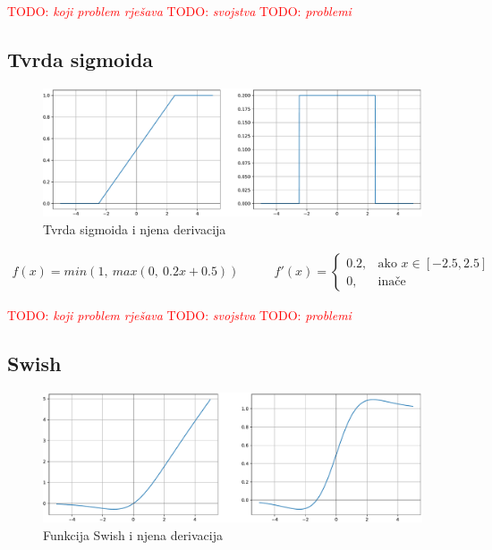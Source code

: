 \documentclass[times, utf8, diplomski]{fer}
\def\TODO#1{\noindent\textcolor{red}{TODO: \textit{#1}}\newline}
\def\todo#1{\TODO{#1}}
\begin{document}
\todo{koji problem rješava}
\todo{svojstva}
\todo{problemi}

\subsection{Tvrda sigmoida}

\begin{figure}[H]
\includegraphics[width=\textwidth]{Hard_sigmoid.pdf}
\centering
\caption{Tvrda sigmoida i njena derivacija}
\label{fig:hard_sigmoid}
\end{figure}

\begin{equation}
\begin{split}
f(x) = min(1,\ max(0,\ 0.2x + 0.5))
\end{split}
\qquad
\begin{split}
f'(x) = 
\begin{cases}
0.2,	 		& \text{ako } x \in [-2.5, 2.5] \\
0,	& \text{inače}
\end{cases}
\end{split}
\end{equation}

\todo{koji problem rješava}
\todo{svojstva}
\todo{problemi}

\subsection{Swish}
\label{func:swish}

\begin{figure}[H]
\includegraphics[width=\textwidth]{Swish.pdf}
\centering
\caption{Funkcija Swish i njena derivacija}
\label{fig:swish}
\end{figure}
\end{document}
